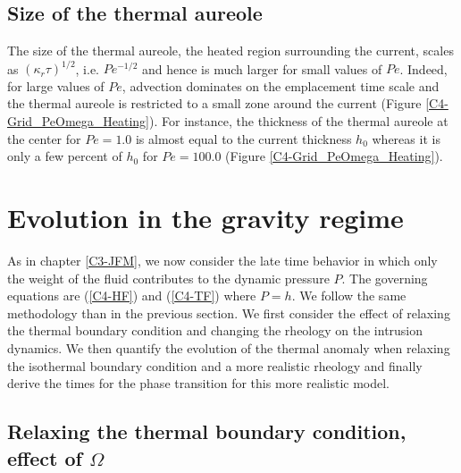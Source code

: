 \subsection{Size of the thermal aureole}
\label{C4-sec:char-therm-anom}

The size  of the  thermal aureole, the  heated region  surrounding the
current,  scales as  $(\kappa_r  \tau)^{1/2}$,  i.e.  $Pe^{-1/2}$  and
hence is  much larger  for small  values of  $Pe$.  Indeed,  for large
values of $Pe$, advection dominates  on the emplacement time scale and
the thermal aureole  is restricted to a small zone  around the current
(Figure  \ref{C4-Grid_PeOmega_Heating}). For  instance, the  thickness of
the thermal aureole at the center  for $Pe=1.0$ is almost equal to the
current thickness $h_0$ whereas it is  only a few percent of $h_0$ for
$Pe=100.0$ (Figure \ref{C4-Grid_PeOmega_Heating}).

\section{Evolution in the gravity regime}
\label{C4-sec:evol-grav-regime}

As in chapter \ref{C3-JFM}, we now  consider the late time behavior in
which only the weight of the fluid contributes to the dynamic pressure
$P$. The governing equations are (\ref{C4-HF}) and (\ref{C4-TF}) where
$P=h$. We follow the same methodology than in the previous section. We
first consider the  effect of relaxing the  thermal boundary condition
and changing the rheology on  the intrusion dynamics. We then quantify
the  evolution of  the thermal  anomaly when  relaxing the  isothermal
boundary condition  and a more  realistic rheology and  finally derive
the times for the phase transition for this more realistic model.

\subsection{Relaxing  the   thermal  boundary  condition,   effect  of
  $\Omega$}
\label{C4-sec:infl-therm-bound}

